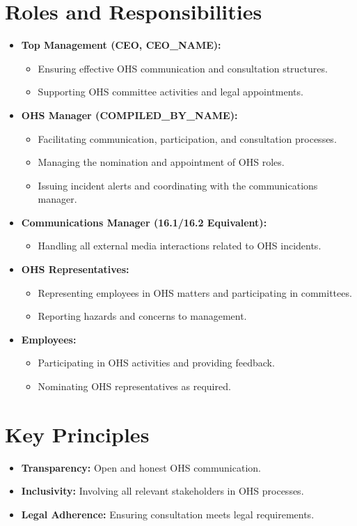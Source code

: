 \documentclass[12pt]{article}
\begin{document}
\section{Roles and Responsibilities}
\begin{itemize}
    \item \textbf{Top Management (CEO, {{CEO_NAME}}):}
    \begin{itemize}
        \item Ensuring effective OHS communication and consultation structures.
        \item Supporting OHS committee activities and legal appointments.
    \end{itemize}
    \item \textbf{OHS Manager ({{COMPILED_BY_NAME}}):}
    \begin{itemize}
        \item Facilitating communication, participation, and consultation processes.
        \item Managing the nomination and appointment of OHS roles.
        \item Issuing incident alerts and coordinating with the communications manager.
    \end{itemize}
    \item \textbf{Communications Manager (16.1/16.2 Equivalent):}
    \begin{itemize}
        \item Handling all external media interactions related to OHS incidents.
    \end{itemize}
    \item \textbf{OHS Representatives:}
    \begin{itemize}
        \item Representing employees in OHS matters and participating in committees.
        \item Reporting hazards and concerns to management.
    \end{itemize}
    \item \textbf{Employees:}
    \begin{itemize}
        \item Participating in OHS activities and providing feedback.
        \item Nominating OHS representatives as required.
    \end{itemize}
\end{itemize}

\section{Key Principles}
\begin{itemize}
    \item \textbf{Transparency:} Open and honest OHS communication.
    \item \textbf{Inclusivity:} Involving all relevant stakeholders in OHS processes.
    \item \textbf{Legal Adherence:} Ensuring consultation meets legal requirements.
\end{itemize}
\end{document}
